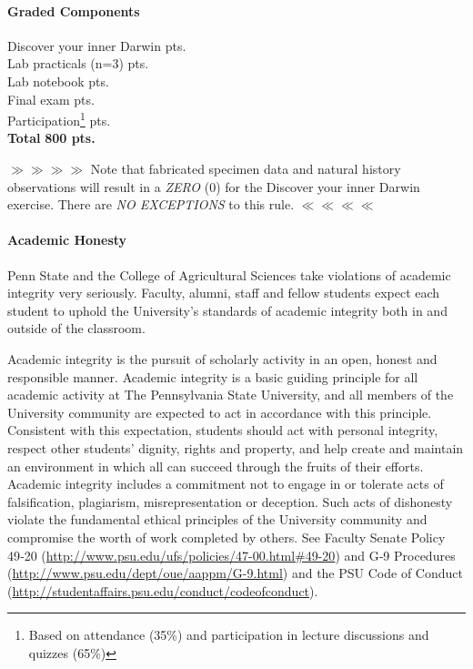 \documentclass[11pt]{article}
\begin{document}
\paragraph{Graded Components}
\begin{center} \begin{minipage}{3.8in}
\begin{flushleft}
Discover your inner Darwin    pts.  \\
Lab practicals (n=3)    pts.  \\
Lab notebook  pts.\\
Final exam    pts.  \\
Participation\footnote{Based on attendance (35\%) and participation in lecture discussions and quizzes (65\%)}     pts.  \\
\textbf{Total}   \dotfill \textbf{800 pts.} 
\end{flushleft}
\end{minipage}
\end{center}
$\gg\gg\gg\gg$ Note that fabricated specimen data and natural history observations will result in a \textit{ZERO} (0) for the Discover your inner Darwin exercise. There are \textit{NO EXCEPTIONS} to this rule. $\ll\ll\ll\ll$

\paragraph{Academic Honesty} Penn State and the College of Agricultural Sciences take violations of academic integrity very seriously. Faculty, alumni, staff and fellow students expect each student to uphold the University’s standards of academic integrity both in and outside of the classroom.

Academic integrity is the pursuit of scholarly activity in an open, honest and responsible manner. Academic integrity is a basic guiding principle for all academic activity at The Pennsylvania State University, and all members of the University community are expected to act in accordance with this principle. Consistent with this expectation, students should act with personal integrity, respect other students' dignity, rights and property, and help create and maintain an environment in which all can succeed through the fruits of their efforts. Academic integrity includes a commitment not to engage in or tolerate acts of falsification, plagiarism, misrepresentation or deception. Such acts of dishonesty violate the fundamental ethical principles of the University community and compromise the worth of work completed by others. See Faculty Senate Policy 49‐20 (\url{http://www.psu.edu/ufs/policies/47-00.html#49-20}) and G‐9 Procedures (\url{http://www.psu.edu/dept/oue/aappm/G-9.html}) and the PSU Code of Conduct (\url{http://studentaffairs.psu.edu/conduct/codeofconduct}).
\end{document}
